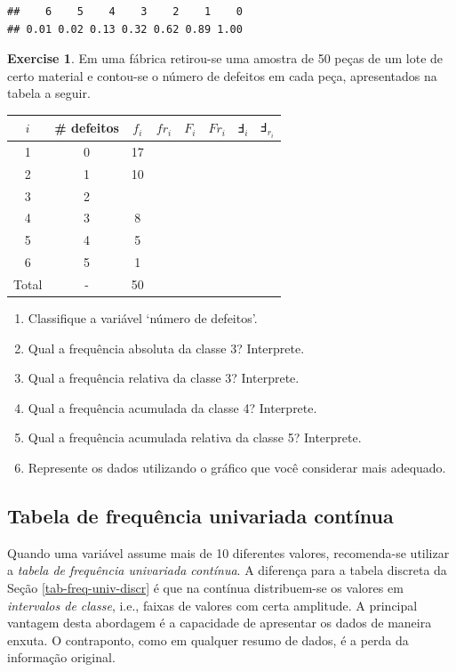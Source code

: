 \documentclass[
]{book}
\providecommand{\tightlist}{%
  \setlength{\itemsep}{0pt}\setlength{\parskip}{0pt}}
\theoremstyle{definition}
\theoremstyle{definition}
\theoremstyle{definition}
\newtheorem{exercise}{Exercise}[chapter]
\theoremstyle{remark}
\begin{document}
\begin{verbatim}
##    6    5    4    3    2    1    0 
## 0.01 0.02 0.13 0.32 0.62 0.89 1.00
\end{verbatim}

\begin{exercise}
\protect\hypertarget{exr:ex-tab-fr1}{}{\label{exr:ex-tab-fr1} }Em uma fábrica retirou-se uma amostra de 50 peças de um lote de certo material e contou-se o número de defeitos em cada peça, apresentados na tabela a seguir.

\begin{longtable}[]{@{}cccccccc@{}}
\toprule
\(i\) & \# defeitos & \(f_i\) & \(fr_i\) & \(F_i\) & \(Fr_i\) & \(\Finv_{i}\) & \(\Finv_{r_{i}}\)\tabularnewline
\midrule
\endhead
1 & 0 & 17 & & & & &\tabularnewline
2 & 1 & 10 & & & & &\tabularnewline
3 & 2 & & & & & &\tabularnewline
4 & 3 & 8 & & & & &\tabularnewline
5 & 4 & 5 & & & & &\tabularnewline
6 & 5 & 1 & & & & &\tabularnewline
Total & - & 50 & & & & &\tabularnewline
\bottomrule
\end{longtable}

\begin{enumerate}
\def\labelenumi{\alph{enumi}.}
\tightlist
\item
  Classifique a variável `número de defeitos'.\\
\item
  Qual a frequência absoluta da classe 3? Interprete.\\
\item
  Qual a frequência relativa da classe 3? Interprete.\\
\item
  Qual a frequência acumulada da classe 4? Interprete.\\
\item
  Qual a frequência acumulada relativa da classe 5? Interprete.\\
\item
  Represente os dados utilizando o gráfico que você considerar mais adequado.
\end{enumerate}
\end{exercise}

\hypertarget{tab-freq-univ-cont}{%
\subsection{Tabela de frequência univariada contínua}\label{tab-freq-univ-cont}}

Quando uma variável assume mais de 10 diferentes valores, recomenda-se utilizar a \emph{tabela de frequência univariada contínua}. A diferença para a tabela discreta da Seção \ref{tab-freq-univ-discr} é que na contínua distribuem-se os valores em \emph{intervalos de classe}, i.e., faixas de valores com certa amplitude. A principal vantagem desta abordagem é a capacidade de apresentar os dados de maneira enxuta. O contraponto, como em qualquer resumo de dados, é a perda da informação original.
\end{document}

